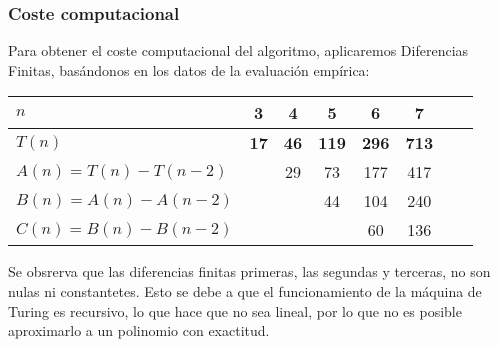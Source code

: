 \subsubsection*{Coste computacional}
Para obtener el coste computacional del algoritmo, aplicaremos Diferencias Finitas, basándonos en los datos de la evaluación empírica:


\begin{table}[h]
    \centering
    \begin{tabular}{|l|c|c|c|c|c|c|c|}
        \hline
        $n$ & \textbf{3} & \textbf{4} & \textbf{5} & \textbf{6} & \textbf{7}\\ \hline
        $T(n)$ & \textbf{17} & \textbf{46} & \textbf{119} & \textbf{296} & \textbf{713}      \\ \hline
        \hline
        $A(n) = T(n) - T(n-2)$ &    & 29 & 73 & 177 & 417 \\ \hline
        $B(n) = A(n) - A(n-2)$ &    &   & 44 & 104 & 240 \\ \hline
        $C(n) = B(n) - B(n-2)$ &    &   &    & 60 & 136 \\ \hline
    \end{tabular}
\end{table}

Se obsrerva que las diferencias finitas primeras, las segundas y terceras, no son nulas ni constantetes. Esto se debe a que el funcionamiento de la máquina de Turing es recursivo, lo que hace que no sea lineal, por lo que no es posible aproximarlo a un polinomio con exactitud.\\
